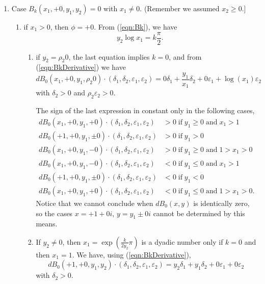 \documentclass [11pt]{article}
\renewcommand {\epsilon}{\varepsilon}
\renewcommand {\leq}{\leqslant}
\renewcommand {\geq}{\geqslant}
\begin{document}
\begin {enumerate}
\begin {enumerate}
    Here, $\delta_2$ can take negative and positive values preventing the sign
    of $dB_k(\sigma_1 0, +1, k, y_2)\cdot (\delta_1, \delta_2, \epsilon_1,
    \epsilon_2)$ from being constant.
  \end {enumerate}

\item Case $B_k(x_1, +0, y_1, y_2)=0$ with $x_1 \neq 0$.
      (Remember we assumed $x_2 \geq 0$.]
  \begin {enumerate}
  \item if $x_1 >0$, then $\phi = +0$.
    From (\ref{eqn:Bk}), we have
    \[
    y_2 \log x_1 = k \frac{\pi}{2}.
    \]
    \begin {enumerate}
    \item if $y_2 = \rho_2 0$, the last equation implies $k = 0$, and from
      (\ref{eqn:BkDerivative}) we have
      \[
      dB_0(x_1, +0, y_1, \rho_2 0)\cdot(\delta_1, \delta_2, \epsilon_1,
      \epsilon_2) = 0 \delta_1 + \frac{y_1}{x_1} \delta_2 + 0 \epsilon_1 +
      \log(x_1) \epsilon_2
      \]
      with $\delta_2 > 0$ and $\rho_2 \epsilon_2 > 0$.

      The sign of the last expression in constant only in the following
      cases,
      \begin {align*}
        dB_0(x_1, +0, y_1, +0)\cdot(\delta_1, \delta_2, \epsilon_1,
        \epsilon_2) &> 0 \;\text{if}\; y_1 \geq 0 \;\text{and}\; x_1 > 1\\
        dB_0(+1, +0, y_1, \pm 0)\cdot(\delta_1, \delta_2, \epsilon_1,
        \epsilon_2) &> 0 \;\text{if}\; y_1 > 0\\
        dB_0(x_1, +0, y_1, -0)\cdot(\delta_1, \delta_2, \epsilon_1,
        \epsilon_2) &> 0 \;\text{if}\; y_1 \geq 0 \;\text{and}\; 1 > x_1 > 0 \\
        dB_0(x_1, +0, y_1, -0)\cdot(\delta_1, \delta_2, \epsilon_1,
        \epsilon_2) &< 0 \;\text{if}\; y_1 \leq 0 \;\text{and}\; x_1 > 1\\
        dB_0(+1, +0, y_1, \pm 0)\cdot(\delta_1, \delta_2, \epsilon_1,
        \epsilon_2) &< 0 \;\text{if}\; y_1 < 0\\
        dB_0(x_1, +0, y_1, +0)\cdot(\delta_1, \delta_2, \epsilon_1,
        \epsilon_2) &< 0 \;\text{if}\; y_1 \leq 0 \;\text{and}\; 1 > x_1 > 0.
      \end {align*}
      Notice that we cannot conclude when $dB_0(x,y)$ is identically zero,
      so the cases $x=+1+0i$, $y=y_1 \pm0i$ cannot be determined by this
      means.

    \item If $y_2 \neq 0$, then $x_1 = \exp\left(\frac{k}{2y_2}\pi\right)$
      is a dyadic number only if $k=0$ and then $x_1=1$.
      We have, using (\ref{eqn:BkDerivative}),
      \[
      dB_0(+1, +0, y_1, y_2)\cdot(\delta_1, \delta_2, \epsilon_1,
      \epsilon_2) = y_2 \delta_1 + y_1 \delta_2 + 0 \epsilon_1 + 0
      \epsilon_2
      \]
      with $\delta_2 > 0$.


\end{enumerate}
\end{enumerate}
\end{enumerate}
\end{document}
